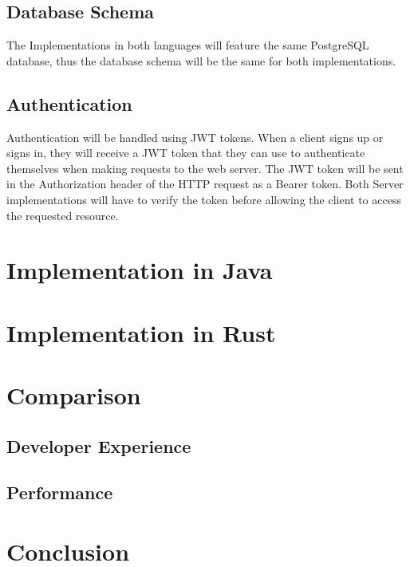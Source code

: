 \documentclass[a4paper,12pt]{article}
\begin{document}
	\subsection{Database Schema}
	\label{subsec:database_schema}
	The Implementations in both languages will feature the same PostgreSQL database, thus the database schema will 
	be the same for both implementations.

	\subsection{Authentication}
	\label{subsec:authentication}
	Authentication will be handled using JWT tokens. When a client signs up or signs in, they will receive a JWT token that they can use to authenticate themselves
	when making requests to the web server. The JWT token will be sent in the Authorization header of the HTTP request as a Bearer token. Both Server
	implementations will have to verify the token before allowing the client to access the requested resource.

	\section{Implementation in Java}
	\label{sec:java_implementation}

	\section{Implementation in Rust}
	\label{sec:rust_implementation}

	\section{Comparison}
	\label{sec:comparison}
	\subsection{Developer Experience}
	\subsection{Performance}
	
	\section{Conclusion}

	\newpage
\end{document}
